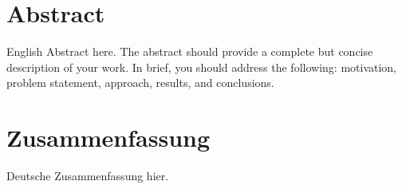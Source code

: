 
\chapter*{Abstract}
English Abstract here. The abstract should provide a complete but concise description of your work. In brief, you should address the following: motivation, problem statement, approach, results, and conclusions. 


{\let\clearpage\relax \chapter*{Zusammenfassung}}
Deutsche Zusammenfassung hier. 

